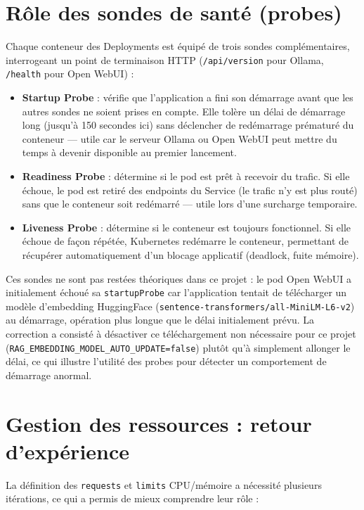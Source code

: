 ﻿\documentclass[11pt,a4paper]{article}
\begin{document}
\section{Rôle des sondes de santé (probes)}
\label{sec:probes}

Chaque conteneur des Deployments est équipé de trois sondes complémentaires, interrogeant un point de terminaison HTTP (\texttt{/api/version} pour Ollama, \texttt{/health} pour Open WebUI) :

\begin{itemize}
    \item \textbf{Startup Probe} : vérifie que l'application a fini son démarrage avant que les autres sondes ne soient prises en compte. Elle tolère un délai de démarrage long (jusqu'à 150 secondes ici) sans déclencher de redémarrage prématuré du conteneur --- utile car le serveur Ollama ou Open WebUI peut mettre du temps à devenir disponible au premier lancement.
    \item \textbf{Readiness Probe} : détermine si le pod est prêt à recevoir du trafic. Si elle échoue, le pod est retiré des endpoints du Service (le trafic n'y est plus routé) sans que le conteneur soit redémarré --- utile lors d'une surcharge temporaire.
    \item \textbf{Liveness Probe} : détermine si le conteneur est toujours fonctionnel. Si elle échoue de façon répétée, Kubernetes redémarre le conteneur, permettant de récupérer automatiquement d'un blocage applicatif (deadlock, fuite mémoire).
    \end{itemize}

Ces sondes ne sont pas restées théoriques dans ce projet : le pod Open WebUI a initialement échoué sa \texttt{startupProbe} car l'application tentait de télécharger un modèle d'embedding HuggingFace (\texttt{sentence-transformers/all-MiniLM-L6-v2}) au démarrage, opération plus longue que le délai initialement prévu. La correction a consisté à désactiver ce téléchargement non nécessaire pour ce projet (\texttt{RAG\_EMBEDDING\_MODEL\_AUTO\_UPDATE=false}) plutôt qu'à simplement allonger le délai, ce qui illustre l'utilité des probes pour détecter un comportement de démarrage anormal.

\section{Gestion des ressources : retour d'expérience}
\label{sec:incidents}

La définition des \texttt{requests} et \texttt{limits} CPU/mémoire a nécessité plusieurs itérations, ce qui a permis de mieux comprendre leur rôle :
\end{document}
